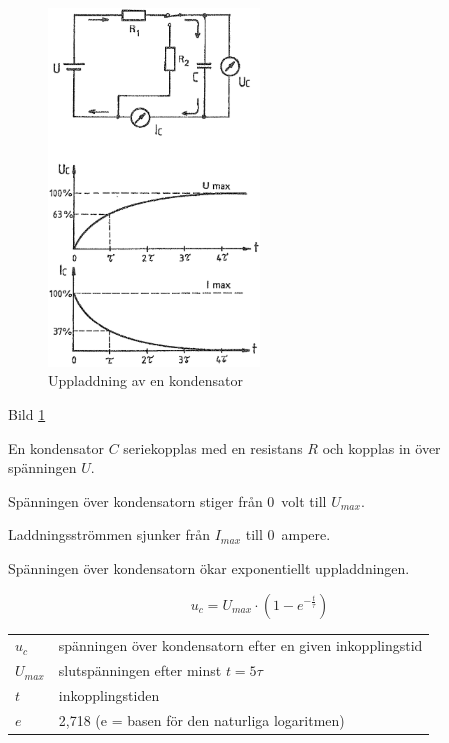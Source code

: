 \begin{figure}
\includegraphics[width=0.5\textwidth]{images/bild_2_3-08.png}
\caption{Uppladdning av en kondensator}
\label{fig:BildII3-08}
\end{figure}


Bild \ref{fig:BildII3-08}

En kondensator \(C\) seriekopplas med en resistans \(R\)
och kopplas in över spänningen \(U\).

Spänningen över kondensatorn stiger från 0~volt till \(U_{max}\).

Laddningsströmmen sjunker från \(I_{max}\) till 0~ampere.

Spänningen över kondensatorn ökar exponentiellt uppladdningen.

\[u_c = U_{max} \cdot ( 1 - e^{-\frac{t}{\tau}} )\]

\begin{tabular}{lp{}}
  \(u_c\)     & spänningen över kondensatorn efter en given inkopplingstid \\
  \(U_{max}\) & slutspänningen efter minst \(t = 5\tau\) \\
  \(t\)       & inkopplingstiden \\
  \(e\)       & 2,718 (e = basen för den naturliga logaritmen) \\
\end{tabular}


